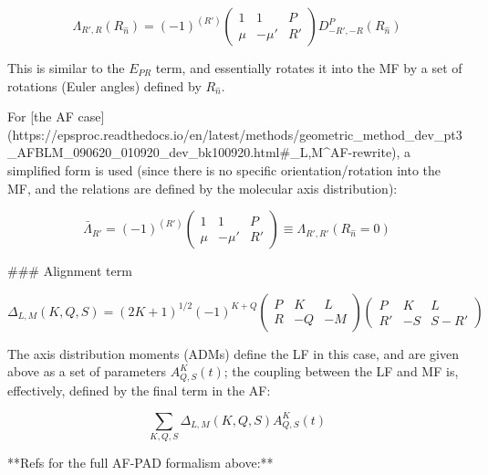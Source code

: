 {\begin{equation}
\Lambda_{R',R}(R_{\hat{n}})=(-1)^{(R')}\left(\begin{array}{ccc}
1 & 1 & P\\
\mu & -\mu' & R'
\end{array}\right)D_{-R',-R}^{P}(R_{\hat{n}})
\end{equation}

This is similar to the $E_{PR}$ term, and essentially rotates it into the MF by a set of rotations (Euler angles) defined by $R_{\hat{n}}$.

For [the AF case](https://epsproc.readthedocs.io/en/latest/methods/geometric_method_dev_pt3_AFBLM_090620_010920_dev_bk100920.html#\beta_{L,M}^{AF}-rewrite), a simplified form is used (since there is no specific orientation/rotation into the MF, and the relations are defined by the molecular axis distribution):

\begin{equation}
\bar{\Lambda}_{R'}=(-1)^{(R')}\left(\begin{array}{ccc}
1 & 1 & P\\
\mu & -\mu' & R'
\end{array}\right)\equiv\Lambda_{R',R'}(R_{\hat{n}}=0)
\end{equation} 


### Alignment term

\begin{equation}
\Delta_{L,M}(K,Q,S)=(2K+1)^{1/2}(-1)^{K+Q}\left(\begin{array}{ccc}
P & K & L\\
R & -Q & -M
\end{array}\right)\left(\begin{array}{ccc}
P & K & L\\
R' & -S & S-R'
\end{array}\right)
\end{equation}

The axis distribution moments (ADMs) define the LF in this case, and are given above as a set of parameters $A_{Q,S}^{K}(t)$; the coupling between the LF and MF is, effectively, defined by the final term in the AF:

\begin{equation}
\sum_{K,Q,S}\Delta_{L,M}(K,Q,S)A_{Q,S}^{K}(t)
\end{equation}


**Refs for the full AF-PAD formalism above:**

}
